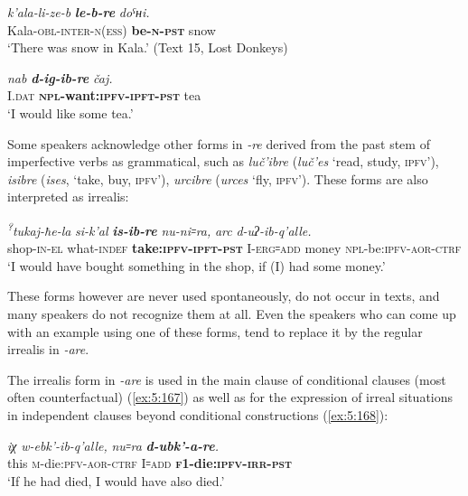 ﻿\documentclass[output=paper]{langsci/langscibook}
\begin{document}
\ea %
\gll \emph{k'ala-li-ze-b} \emph{\textbf{le-b-re}} \emph{doˤʜi.}\\
 Kala-\textsc{obl}-\textsc{inter}-\textsc{n}(\textsc{ess}) \textbf{{be}-\textsc{n}-\textsc{pst}} snow\\
\glt `There was snow in Kala.' (Text 15, Lost Donkeys)

\ex %
\gll \emph{nab} \emph{\textbf{d-ig-ib-re}} \emph{čaj.}\\
 I.\textsc{dat} \textbf{\textsc{npl}-want:\textsc{ipfv}-\textsc{ipft}-\textsc{pst}} tea\\
\glt `I would like some tea.'
\z

Some speakers acknowledge other forms in \emph{-re} derived from the
past stem of imperfective verbs as grammatical, such as \emph{luč'ibre}
(\emph{luč'es} `read, study, \textsc{ipfv}'), \emph{isibre} (\emph{ises}, `take,
buy, \textsc{ipfv}'), \emph{urcibre} (\emph{urces} `fly, \textsc{ipfv}'). These forms are
also interpreted as irrealis:

\ea %
\gll \emph{\textsuperscript{?}tukaj-ħe-la} \emph{si-k'al} \emph{\textbf{is-ib-re}} \emph{nu-ni꞊ra,} \emph{arc} \emph{d-uʔ-ib-q'alle.}\\
 shop-\textsc{in}-\textsc{el} what-\textsc{indef} \textbf{take:\textsc{ipfv}-\textsc{ipft}-\textsc{pst}} I-\textsc{erg}꞊\textsc{add}  money  \textsc{npl}-be:\textsc{ipfv}-\textsc{aor}-\textsc{ctrf} \\
\glt `I would have bought something in the shop, if (I\textsc{)} had some money.'
\z

These forms however are never used spontaneously, do not occur in texts,
and many speakers do not recognize them at all. Even the speakers who
can come up with an example using one of these forms, tend to replace it
by the regular irrealis in \emph{-are}.

The irrealis form in \emph{-are} is used in the main clause of
conditional clauses (most often counterfactual) (\ref{ex:5:167}) as well as for the
expression of irreal situations in independent clauses beyond
conditional constructions (\ref{ex:5:168}):

\ea \label{ex:5:167} %
\gll \emph{iχ} \emph{w-ebk'-ib-q'alle,} \emph{nu꞊ra} \emph{\textbf{d-ubk'-a-re}.}\\
 this \textsc{m}-die:\textsc{pfv}-\textsc{aor}-\textsc{ctrf} I꞊\textsc{add} \textbf{\textsc{f1}-die:\textsc{ipfv}-\textsc{irr}-\textsc{pst}}\\
\glt `If he had died, I would have also died.'
\end{document}
